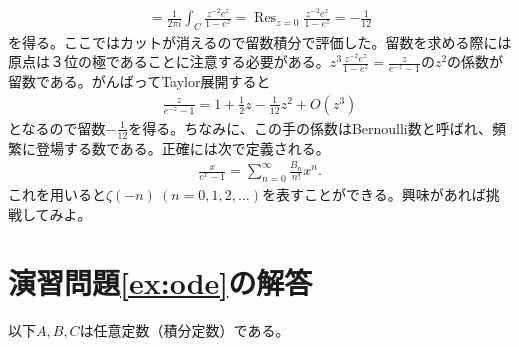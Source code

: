 \documentclass[report,paper=a4, fontsize=12pt, line_length=16cm, number_of_lines=33,dvipdfmx]{jlreq}
\numberwithin{equation}{section}
\DeclareMathOperator*{\Resi}{\mathrm{Res}}
\begin{document}
\begin{enumerate}
\begin{enumerate}
\begin{align*}
      =\frac{1}{2\pi i}\int_{C}\frac{z^{-2}e^{z}}{1-e^z}
      =\Resi_{z=0}\frac{z^{-2}e^{z}}{1-e^z}
      =-\frac{1}{12}
    \end{align*}
    を得る。ここではカットが消えるので留数積分で評価した。留数を求める際には原点は３位の極であることに注意する必要がある。$z^3\frac{z^{-2}e^{z}}{1-e^z}=\frac{z}{e^{-z}-1}$の$z^2$の係数が留数である。がんばってTaylor展開すると
    \begin{align*}
      \frac{z}{e^{-z}-1}=1+\frac 12 z - \frac{1}{12} z^2+O(z^3)
    \end{align*}
    となるので留数$-\frac{1}{12}$を得る。ちなみに、この手の係数はBernoulli数と呼ばれ、頻繁に登場する数である。正確には次で定義される。
    \begin{align*}
      \frac{x}{e^x-1}=\sum_{n=0}^{\infty}\frac{B_n}{n!}x^n.
    \end{align*}
    これを用いると$\zeta(-n)\ (n=0,1,2,\dots)$を表すことができる。興味があれば挑戦してみよ。
  \end{enumerate}
\end{enumerate}

\section*{演習問題\ref{ex:ode}の解答}
以下$A,B,C$は任意定数（積分定数）である。
\end{document}
